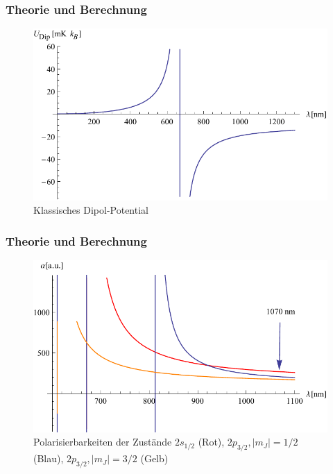 \documentclass{beamer}
\begin{document}
\begin{frame}
	\frametitle{Theorie und Berechnung}
	\begin{figure}
	\centering
	\includegraphics[scale=0.7]{classicpotential}
	\caption{Klassisches Dipol-Potential}
	\end{figure}
\end{frame}
\begin{frame}
	\frametitle{Theorie und Berechnung}
\begin{center}
	\begin{figure}
                \includegraphics[scale=0.7]{alphaalltogether}
           	\caption{Polarisierbarkeiten der Zustände $2s_{1/2}$ (Rot), $2p_{3/2}, |m_J|=1/2$ (Blau), $2p_{3/2}, |m_J|=3/2$ (Gelb) }
\end{figure}
\end{center}
\end{frame}
\end{document}
